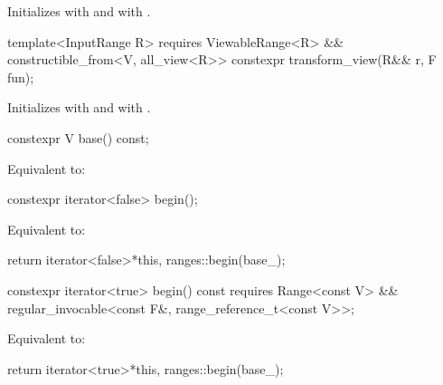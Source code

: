 \begin{itemdescr}
\pnum
\effects Initializes  with  and
 with .
\end{itemdescr}

%
\begin{itemdecl}
template<InputRange R>
  requires ViewableRange<R> && constructible_from<V, all_view<R>>
constexpr transform_view(R&& r, F fun);
\end{itemdecl}

\begin{itemdescr}
\pnum
\effects Initializes  with 
and  with .
\end{itemdescr}

%
\begin{itemdecl}
constexpr V base() const;
\end{itemdecl}

\begin{itemdescr}
\pnum
\effects Equivalent to: 
\end{itemdescr}

%
\begin{itemdecl}
constexpr iterator<false> begin();
\end{itemdecl}

\begin{itemdescr}
\pnum
\effects Equivalent to:
\begin{codeblock}
return iterator<false>{*this, ranges::begin(base_)};
\end{codeblock}
\end{itemdescr}

%
\begin{itemdecl}
constexpr iterator<true> begin() const
  requires Range<const V> &&
           regular_invocable<const F&, range_reference_t<const V>>;
\end{itemdecl}

\begin{itemdescr}
\pnum
\effects Equivalent to:
\begin{codeblock}
return iterator<true>{*this, ranges::begin(base_)};
\end{codeblock}
\end{itemdescr}

